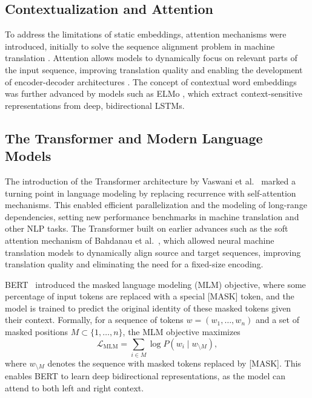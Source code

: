 \subsection{Contextualization and Attention}
To address the limitations of static embeddings, attention mechanisms were introduced, initially to solve the sequence alignment problem in machine translation \citep{bahdanau2015neural,luong2015effective}. Attention allows models to dynamically focus on relevant parts of the input sequence, improving translation quality and enabling the development of encoder-decoder architectures \citep{sutskever2014sequence}. The concept of contextual word embeddings was further advanced by models such as ELMo \citep{peters2018deep}, which extract context-sensitive representations from deep, bidirectional LSTMs.

\subsection{The Transformer and Modern Language Models}
The introduction of the Transformer architecture by Vaswani et al.~\citep{vaswani2017attention} marked a turning point in language modeling by replacing recurrence with self-attention mechanisms. This enabled efficient parallelization and the modeling of long-range dependencies, setting new performance benchmarks in machine translation and other NLP tasks. The Transformer built on earlier advances such as the soft attention mechanism of Bahdanau et al.~\citep{bahdanau2015neural}, which allowed neural machine translation models to dynamically align source and target sequences, improving translation quality and eliminating the need for a fixed-size encoding.

BERT~\citep{devlin2019bert} introduced the masked language modeling (MLM) objective, where some percentage of input tokens are replaced with a special [MASK] token, and the model is trained to predict the original identity of these masked tokens given their context. Formally, for a sequence of tokens $w = (w_1, \ldots, w_n)$ and a set of masked positions $M \subset \{1, \ldots, n\}$, the MLM objective maximizes
\begin{equation}
    \mathcal{L}_{\text{MLM}} = \sum_{i \in M} \log P(w_i \mid w_{\setminus M}),
\end{equation}
where $w_{\setminus M}$ denotes the sequence with masked tokens replaced by [MASK]. This enables BERT to learn deep bidirectional representations, as the model can attend to both left and right context. 

